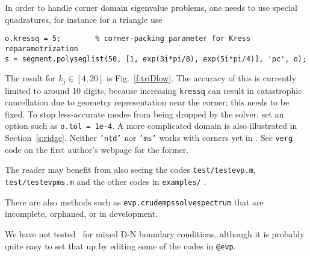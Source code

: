 In order to handle corner domain eigenvalue problems, one needs to
use special quadratures,
for instance for a triangle use
\begin{verbatim}
o.kressq = 5;        % corner-packing parameter for Kress reparametrization
s = segment.polyseglist(50, [1, exp(3i*pi/8), exp(5i*pi/4)], 'pc', o);
\end{verbatim}
The result for $k_j \in [4,20]$ is Fig.~\ref{f:triDlow}.
The accuracy of this is currently limited to around 10 digits,
because increasing {\tt kressq}
can result in catastrophic cancellation due to geometry representation
near the corner; this needs to be fixed.
To stop less-accurate modes from being dropped by the solver,
set an option such as
{\tt o.tol = 1e-4}.
A more complicated domain is also illustrated in Section~\ref{s:ridge}.
Neither {\tt 'ntd'} nor {\tt 'ms'} works with corners yet in \mpspack.
See {\tt verg} code on the first author's webpage for the former.

The reader may benefit from also seeing the
codes {\tt test/testevp.m}, {\tt test/testevpms.m}
and the other codes in {\tt examples/} .

There are also methods such as {\tt evp.crudempssolvespectrum}
that are incomplete, orphaned, or in development.

We have not tested \mpspack\ for mixed D-N boundary conditions, although
it is probably quite easy to set that up by editing some of the
codes in {\tt @evp}.



